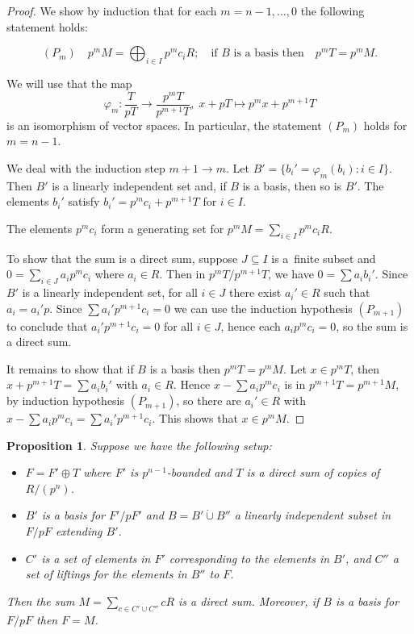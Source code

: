 \documentclass[twoside,leqno,12pt]{amsart}
\def\dotcup{\operatorname{\dot\cup}}
\newtheorem{prop}[thm]{Proposition}
\theoremstyle{definition}
\theoremstyle{remark}
\numberwithin{equation}{section}
\begin{document}
\begin{proof}
  We show by induction that for each $m=n-1,\ldots,0$ the following statement holds:

  $$(P_m) \quad p^mM=\bigoplus_{i\in I} p^mc_iR; \quad\text{if $B$ is a basis then}\quad
  p^mT=p^mM.$$

  We will use that the map
  $$\varphi_m: \frac{T}{pT}\to\frac{p^mT}{p^{m+1}T}, \;x+pT\mapsto p^mx+p^{m+1}T$$
  is an isomorphism of vector spaces.  In particular, the statement $(P_m)$ holds
  for $m=n-1$.


  We deal with the induction step $m+1\to m$.
  Let $B'=\{b_i'=\varphi_m(b_i)  :i\in I\}$.
  Then $B'$ is a linearly independent set and, if $B$ is a basis, then so is $B'$.
  The elements $b_i'$ satisfy $b_i'=p^mc_i+p^{m+1}T$ for $i\in I$.


  The elements $p^mc_i$ form a generating set for $p^mM=\sum_{i\in I}p^mc_iR$.


  To show that the sum is a direct sum, suppose $J\subseteq I$ is a~finite subset
  and $0=\sum_{i\in J} a_ip^mc_i$ where
  $a_i\in R$.   Then in $p^mT/p^{m+1}T$, we have
  $0=\sum a_ib_i'$.  Since  $B'$ is a linearly independent set,
  for all $i\in J$ there exist $a_i'\in R$ such that $a_i=a_i'p$.
  Since $\sum a_i'p^{m+1}c_i=0$ we can use the induction hypothesis $(P_{m+1})$ to conclude
  that $a_i'p^{m+1}c_i=0$ for all $i\in J$, hence each $a_ip^mc_i=0$, so
  the sum is a direct sum.


  It remains to show that if $B$ is a basis then $p^mT=p^mM$.
  Let $x\in p^mT$, then $x+p^{m+1}T=\sum a_ib_i'$ with $a_i\in R$.
  Hence $x-\sum a_ip^mc_i$ is in $p^{m+1}T=p^{m+1}M$, by induction hypothesis $(P_{m+1})$,
  so there are
  $a_i'\in R$ with $x-\sum a_ip^mc_i=\sum a_i'p^{m+1}c_i$.
  This shows that $x\in p^mM$.
\end{proof}

\begin{prop}
  \label{prop-lifting}
  Suppose we have the following setup:
  \begin{itemize}
    \item $F=F'\oplus T$ where $F'$ is $p^{n-1}$-bounded and $T$ is a direct
      sum of copies of $R/(p^n)$.
    \item $B'$ is a basis for
        $F'/pF'$ and $B=B'\dotcup B''$ a linearly independent subset in $F/pF$ extending $B'$.
    \item $C'$ is a set of elements in $F'$ corresponding to the elements in $B'$,
      and $C''$ a set of liftings for the elements in $B''$ to $F$.
  \end{itemize}
  Then the sum $M=\sum_{c\in C'\dotcup C''} c R$ is a direct sum.
  Moreover, if $B$ is a basis for $F/pF$ then $F=M$.
\end{prop}
\end{document}
